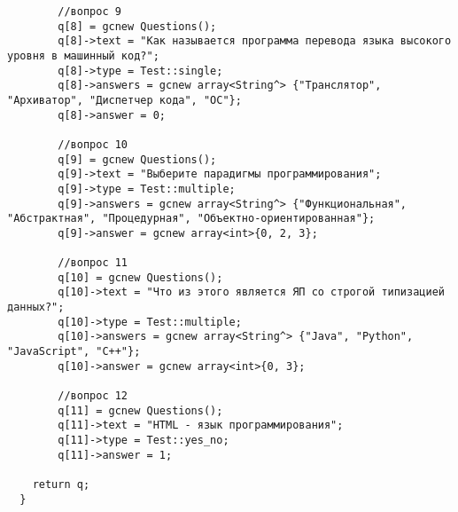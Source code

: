 \begin{verbatim}
        //вопрос 9
        q[8] = gcnew Questions();
        q[8]->text = "Как называется программа перевода языка высокого уровня в машинный код?";
        q[8]->type = Test::single;
        q[8]->answers = gcnew array<String^> {"Транслятор", "Архиватор", "Диспетчер кода", "ОС"};
        q[8]->answer = 0;

        //вопрос 10
        q[9] = gcnew Questions();
        q[9]->text = "Выберите парадигмы программирования";
        q[9]->type = Test::multiple;
        q[9]->answers = gcnew array<String^> {"Функциональная", "Абстрактная", "Процедурная", "Объектно-ориентированная"};
        q[9]->answer = gcnew array<int>{0, 2, 3};

        //вопрос 11
        q[10] = gcnew Questions();
        q[10]->text = "Что из этого является ЯП со строгой типизацией данных?";
        q[10]->type = Test::multiple;
        q[10]->answers = gcnew array<String^> {"Java", "Python", "JavaScript", "C++"};
        q[10]->answer = gcnew array<int>{0, 3};

        //вопрос 12
        q[11] = gcnew Questions();
        q[11]->text = "HTML - язык программирования";
        q[11]->type = Test::yes_no;
        q[11]->answer = 1;

    return q;
  }
\end{verbatim}

